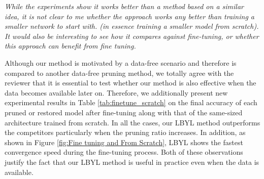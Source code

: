 \textit{While the experiments show it works better than a method based on a similar idea, it is not clear to me whether the approach works any better than training a smaller network to start with. (in essence training a smaller model from scratch). It would also be interesting to see how it compares against fine-tuning, or whether this approach can benefit from fine tuning.}

Although our method is motivated by a data-free scenario and therefore is compared to another data-free pruning method, we totally agree with the reviewer that it is essential to test whether our method is also effective when the data becomes available later on. Therefore, we additionally present new experimental results in Table \ref{tab:finetune_scratch} on the final accuracy of each pruned or restored model after fine-tuning along with that of the same-sized architecture trained from scratch. In all the cases, our LBYL method outperforms the competitors particularly when the pruning ratio increases. In addition, as shown in Figure \ref{fig:Fine tuning and From Scratch}, LBYL shows the fastest convergence speed during the fine-tuning process. Both of these observations justify the fact that our LBYL method is useful in practice even when the data is available.





